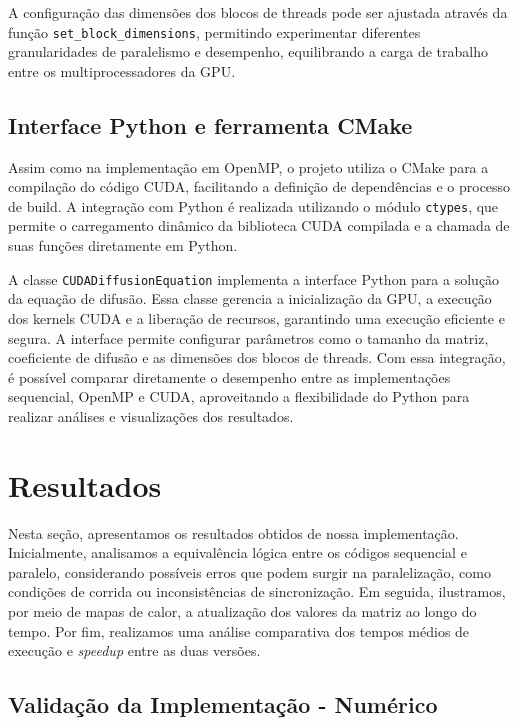 \documentclass[12pt]{article}
\begin{document}
A configuração das dimensões dos blocos de threads pode ser ajustada através da
função \texttt{set\_block\_dimensions}, permitindo experimentar diferentes
granularidades de paralelismo e desempenho, equilibrando a carga de trabalho
entre os multiprocessadores da GPU\@.

\subsection{Interface Python e ferramenta CMake}

Assim como na implementação em OpenMP, o projeto utiliza o CMake para a
compilação do código CUDA, facilitando a definição de dependências e o processo
de build. A integração com Python é realizada utilizando o módulo
\texttt{ctypes}, que permite o carregamento dinâmico da biblioteca CUDA
compilada e a chamada de suas funções diretamente em Python.

A classe \texttt{CUDADiffusionEquation} implementa a interface Python para a
solução da equação de difusão. Essa classe gerencia a inicialização da GPU, a
execução dos kernels CUDA e a liberação de recursos, garantindo uma execução
eficiente e segura. A interface permite configurar parâmetros como o tamanho da
matriz, coeficiente de difusão e as dimensões dos blocos de threads. Com essa
integração, é possível comparar diretamente o desempenho entre as
implementações sequencial, OpenMP e CUDA, aproveitando a flexibilidade do
Python para realizar análises e visualizações dos resultados.

\section{Resultados}

Nesta seção, apresentamos os resultados obtidos de nossa implementação.
Inicialmente, analisamos a equivalência lógica entre os códigos sequencial e
paralelo, considerando possíveis erros que podem surgir na paralelização, como
condições de corrida ou inconsistências de sincronização. Em seguida,
ilustramos, por meio de mapas de calor, a atualização dos valores da matriz ao
longo do tempo. Por fim, realizamos uma análise comparativa dos tempos médios
de execução e \textit{speedup} entre as duas versões.

\subsection{Validação da Implementação - Numérico}
\end{document}
